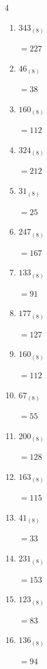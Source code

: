 \begin{multicols}{4}
\begin{enumerate}
        $=96$

  \item $343_{(8)}$

        $=227$

  \item $46_{(8)}$

        $=38$

  \item $160_{(8)}$

        $=112$

  \item $324_{(8)}$

        $=212$

  \item $31_{(8)}$

        $=25$

  \item $247_{(8)}$

        $=167$

  \item $133_{(8)}$

        $=91$

  \item $177_{(8)}$

        $=127$

  \item $160_{(8)}$

        $=112$

\columnbreak %

  \item $67_{(8)}$

        $=55$

  \item $200_{(8)}$

        $=128$

  \item $163_{(8)}$

        $=115$

  \item $41_{(8)}$

        $=33$

  \item $231_{(8)}$

        $=153$

  \item $123_{(8)}$

        $=83$

  \item $136_{(8)}$

        $=94$


\end{enumerate}
\end{multicols}
